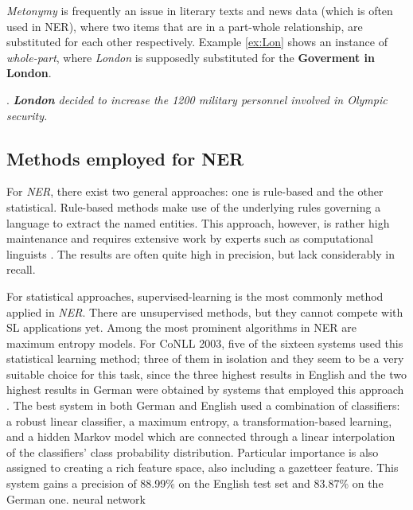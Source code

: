 \documentclass[11pt]{article}
\begin{document}
\emph{Metonymy} is frequently an issue in literary texts and news data (which is often used in NER), where two items that are in a part-whole
relationship, are substituted for each other respectively. Example \ref{ex:Lon} shows an instance of \emph{whole-part}, 
where \emph{London} is supposedly substituted for the \textbf{Goverment in London}. 

\ex. \emph{\textbf{London} decided to increase the 1200 military personnel involved in Olympic security.} \label{ex:Lon}

\subsection{Methods employed for NER}
For \emph{NER}, there exist two general approaches: one is rule-based and the other statistical. 
Rule-based methods make use of the underlying rules governing a language to extract the named entities. 
This approach, however, is rather high maintenance and requires extensive work by experts such as computational linguists \cite{nadeau2007survey}.
The results are often quite high in precision, but lack considerably in recall. %

For statistical approaches, supervised-learning is the most commonly method applied in \emph{NER}. 
There are unsupervised methods, but they cannot compete with SL applications yet.
Among the most prominent algorithms in NER are maximum entropy models. For CoNLL 2003, five of the sixteen systems
used this statistical learning method; three of them in isolation and they seem to be a very suitable choice for this task, since the three highest results in 
English and the two highest results in German were obtained by systems that employed this approach \cite{TjongKimSang:2003:ICS:1119176.1119195}.
The best system in both German and English \cite{Florian:2003:NER:1119176.1119201} used a combination of classifiers: a robust linear classifier, a maximum entropy, a transformation-based learning, and a hidden Markov model which are connected through a linear interpolation of the classifiers’ %
class probability distribution. Particular importance is also assigned to creating a rich feature space, also including a gazetteer feature. 
This system gains a precision of 88.99\% on the English test set and  83.87\% on the German one. 
neural network
\end{document}

